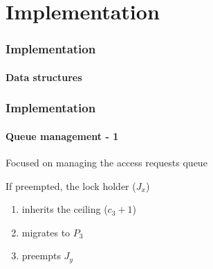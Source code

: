 

\section{Implementation}




	



\begin{frame}

	\frametitle{Implementation}
	\framesubtitle{Data structures}

	\centerline{}

\end{frame}

\begin{frame}

	\frametitle{Implementation}
	\framesubtitle{Queue management - 1}

	Focused on managing the access requests queue

	\vspace{0.2cm}

	\centerline{}

	\vspace{0.2cm}

	If preempted, the lock holder ($J_x$)
		\begin{enumerate}
			\item inherits the ceiling ($c_3 + 1$)
			\item migrates to $P_3$
			\item preempts $J_y$
		\end{enumerate}
\end{frame}

